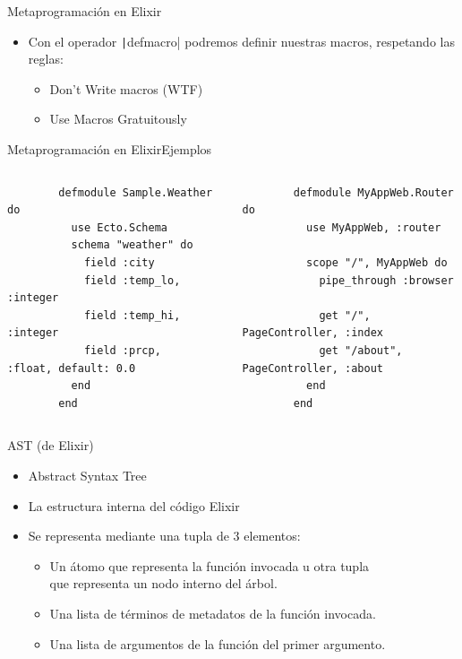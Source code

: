 \documentclass[14pt,aspectratio=169]{beamer}
\begin{document}
\begin{frame}{Metaprogramación en Elixir}
  \begin{itemize}
    \item Con el operador \texttt|defmacro| podremos definir
    nuestras macros, respetando las reglas\footnotemark:
    \begin{itemize}
      \item Don't Write macros (WTF)
      \item Use Macros Gratuitously
    \end{itemize}
  \end{itemize}
\end{frame}

\begin{frame}[fragile]{Metaprogramación en Elixir}{Ejemplos}
  \begin{columns}
    \begin{column}{0.5\textwidth}
      \scriptsize \begin{verbatim}
        defmodule Sample.Weather do
          use Ecto.Schema
          schema "weather" do
            field :city
            field :temp_lo, :integer
            field :temp_hi, :integer
            field :prcp,    :float, default: 0.0
          end
        end
      \end{verbatim}
    \end{column}
    \begin{column}{0.5\textwidth}
      \scriptsize \begin{verbatim}
        defmodule MyAppWeb.Router do
          use MyAppWeb, :router

          scope "/", MyAppWeb do
            pipe_through :browser

            get "/", PageController, :index
            get "/about", PageController, :about
          end
        end
      \end{verbatim}
    \end{column}
  \end{columns}
\end{frame}

\begin{frame}{AST (de Elixir)}
  \begin{itemize}
    \item Abstract Syntax Tree
    \item La estructura interna del código Elixir
    \item Se representa mediante una tupla de 3 elementos:
    \begin{itemize}
      \item Un átomo que representa la función invocada u otra tupla\\
      que representa un nodo interno del árbol.
      \item Una lista de términos de metadatos de la función invocada.
      \item Una lista de argumentos de la función del primer argumento.
    \end{itemize}
  \end{itemize}
\end{frame}
\end{document}
